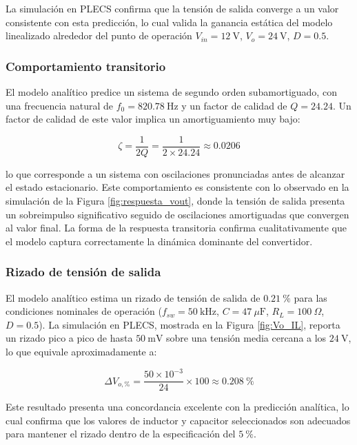 \documentclass[conference]{IEEEtran}
\begin{document}
La simulación en PLECS confirma que la tensión de salida converge a un valor
consistente con esta predicción, lo cual valida la ganancia estática del modelo
linealizado alrededor del punto de operación $V_{in}=12~\mathrm{V}$,
$V_o=24~\mathrm{V}$, $D=0.5$.

\subsubsection{Comportamiento transitorio}

El modelo analítico predice un sistema de segundo orden subamortiguado, con una
frecuencia natural de $f_0 = 820.78~\mathrm{Hz}$ y un factor de calidad de $Q = 24.24$.
Un factor de calidad de este valor implica un amortiguamiento muy bajo:

\begin{equation}
    \zeta = \frac{1}{2Q} = \frac{1}{2 \times 24.24} \approx 0.0206
\end{equation}

lo que corresponde a un sistema con oscilaciones pronunciadas antes de alcanzar
el estado estacionario. Este comportamiento es consistente con lo observado en la
simulación de la Figura \ref{fig:respuesta_vout}, donde la tensión de salida presenta
un sobreimpulso significativo seguido de oscilaciones amortiguadas que convergen
al valor final. La forma de la respuesta transitoria confirma cualitativamente
que el modelo captura correctamente la dinámica dominante del convertidor.

\subsubsection{Rizado de tensión de salida}

El modelo analítico estima un rizado de tensión de salida de $0.21~\%$ para las
condiciones nominales de operación ($f_{sw} = 50~\mathrm{kHz}$, $C = 47~\mu\mathrm{F}$,
$R_L = 100~\Omega$, $D = 0.5$). La simulación en PLECS, mostrada en la Figura
\ref{fig:Vo_IL}, reporta un rizado pico a pico de hasta $50~\mathrm{mV}$ sobre
una tensión media cercana a los $24~\mathrm{V}$, lo que equivale aproximadamente a:

\begin{equation}
    \Delta V_{o,\%} = \frac{50 \times 10^{-3}}{24} \times 100 \approx 0.208~\%
\end{equation}

Este resultado presenta una concordancia excelente con la predicción analítica,
lo cual confirma que los valores de inductor y capacitor seleccionados son adecuados
para mantener el rizado dentro de la especificación del $5~\%$.
\end{document}
